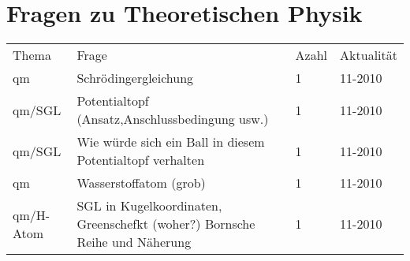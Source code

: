 



\section{Fragen zu Theoretischen Physik}

\begin{tabular}{lp{10cm}ll}
 Thema& Frage&Azahl&Aktualität\\
qm&Schrödingergleichung&1&11-2010\\
qm/SGL& Potentialtopf (Ansatz,Anschlussbedingung usw.)&1&11-2010\\
qm/SGL&Wie würde sich ein Ball in diesem Potentialtopf verhalten&1&11-2010\\
qm&Wasserstoffatom (grob)&1&11-2010\\
qm/H-Atom&SGL in Kugelkoordinaten, Greenschefkt (woher?) Bornsche Reihe und Näherung&1&11-2010\\

\end{tabular}




